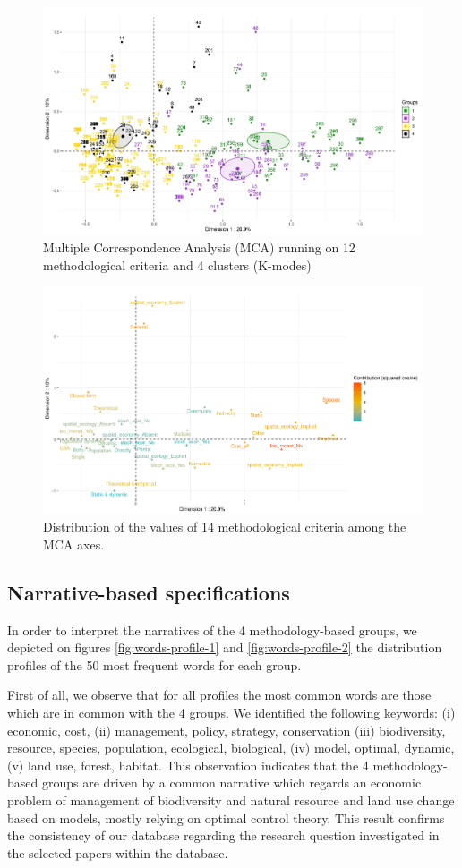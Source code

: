 \begin{figure}[H]
\includegraphics[width=.9\textwidth]{figures/review/mca_ind_automated_kmodes_rev.png}
\caption{\label{fig:MCA} Multiple Correspondence Analysis (MCA) running on 12 methodological criteria and 4 clusters (K-modes)}
\end{figure}
\begin{figure}[H]
\includegraphics[width=.9\textwidth]{figures/review/mca_variables_automated.pdf}
\caption{\label{fig:MCA-motsclefs} Distribution of the values of 14 methodological criteria among the MCA axes.}
\end{figure}

\subsection{Narrative-based specifications}

In order to interpret the narratives of the 4 methodology-based groups, we depicted on figures \ref{fig:words-profile-1} and \ref{fig:words-profile-2} the distribution profiles of the 50 most frequent words for each group. 

First of all, we observe that for all profiles the most common words are those which are in common with the 4 groups.  We identified the following keywords: (i) economic, cost, (ii) management, policy, strategy, conservation (iii) biodiversity, resource, species, population, ecological, biological, (iv) model, optimal, dynamic, (v) land use, forest, habitat. This observation indicates that the 4 methodology-based groups are driven by a common narrative which regards an economic problem of management of biodiversity and natural resource and land use change based on models, mostly relying on optimal control theory. This result confirms the consistency of our database regarding the  research question investigated in the selected papers within the database.

